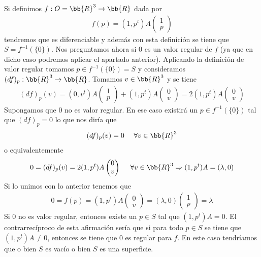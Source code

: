 \begin{ejemplo}
\begin{enumerate}
        Si definimos $f:O=\bb{R}^3 \to \bb{R}$ dada por 
        \begin{gather*}
            f(p) =  (1,p^t)A \begin{pmatrix} 1\\p\end{pmatrix}
        \end{gather*}
        tendremos que es diferenciable y además con esta definición se tiene que $S=f^{-1}(\{0\})$. Nos preguntamos ahora si $0$ es un valor regular de $f$ (ya que en dicho caso podremos aplicar el apartado anterior). Aplicando la definición de valor regular tomamos $p\in f^{-1}(\{0\})=S$ y consideramos $(df)_p:\bb{R}^3 \to \bb{R}$. Tomamos $v\in \bb{R}^3$ y se tiene 
        \begin{gather*}
            (df)_p(v) = (0,v^t)A\begin{pmatrix} 1\\p\end{pmatrix} + (1,p^t)A\begin{pmatrix} 0\\v\end{pmatrix} = 2(1,p^t)A\begin{pmatrix} 0\\v\end{pmatrix}
        \end{gather*}
        Supongamos que $0$ no es valor regular. En ese caso existirá un $p\in f^{-1}(\{0\})$ tal que $(df)_p = 0$ lo que nos diría que 
        \begin{gather*}
            (df)_p(v) = 0 \ \ \ \ \forall v \in \bb{R}^3
        \end{gather*}
        o equivalentemente
        \begin{gather*}
            0 = (df)_p(v) = 2(1,p^t)A \begin{pmatrix} 0\\v\end{pmatrix} \ \ \ \ \forall v \in \bb{R}^3 \Rightarrow (1,p^t)A = (\lambda, 0)
        \end{gather*}
        Si lo unimos con lo anterior tenemos que 
        \begin{gather*}
            0 = f(p) = (1,p^t)A \begin{pmatrix} 0\\v\end{pmatrix} = (\lambda, 0)\begin{pmatrix} 1\\p\end{pmatrix} = \lambda
        \end{gather*}
        Si $0$ no es valor regular, entonces existe un $p\in S$ tal que $(1,p^t)A = 0$. El contrarrecíproco de esta afirmación sería que si para todo $p\in S$ se tiene que $(1,p^t)A\neq 0$, entonces se tiene que $0$ es regular para $f$. En este caso tendríamos que o bien $S$ es vacío o bien $S$ es una superficie.\\
        

\end{enumerate}
\end{ejemplo}
